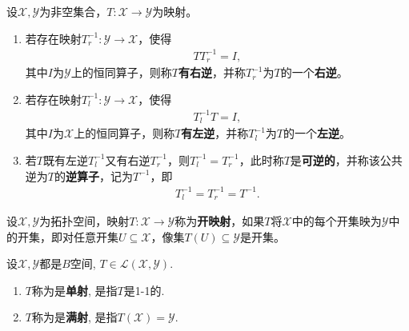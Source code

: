 \documentclass[../../main.tex]{subfiles}%
\begin{document}
\begin{definition}
设$\mathscr{X},\mathscr{Y}$为非空集合，$T:\mathscr{X}\to\mathscr{Y}$为映射。
\begin{enumerate}[(1)]
\item 若存在映射$T_r^{-1}:\mathscr{Y}\to\mathscr{X}$，使得
\begin{align*}
TT_r^{-1} = I,
\end{align*}
其中$I$为$\mathscr{Y}$上的恒同算子，则称$T$\textbf{有右逆}，并称$T_r^{-1}$为$T$的一个\textbf{右逆}。
\item 若存在映射$T_l^{-1}:\mathscr{Y}\to\mathscr{X}$，使得
\begin{align*}
T_l^{-1}T = I,
\end{align*}
其中$I$为$\mathscr{X}$上的恒同算子，则称$T$\textbf{有左逆}，并称$T_l^{-1}$为$T$的一个\textbf{左逆}。
\item 若$T$既有左逆$T_l^{-1}$又有右逆$T_r^{-1}$，则$T_l^{-1}=T_r^{-1}$，此时称$T$是\textbf{可逆的}，并称该公共逆为$T$的\textbf{逆算子}，记为$T^{-1}$，即
\begin{align*}
T_l^{-1} = T_r^{-1} = T^{-1}.
\end{align*}
\end{enumerate}
\end{definition}

\begin{definition}
设$\mathscr{X},\mathscr{Y}$为拓扑空间，映射$T:\mathscr{X}\to\mathscr{Y}$称为\textbf{开映射}，如果$T$将$\mathscr{X}$中的每个开集映为$\mathscr{Y}$中的开集，即对任意开集$U\subseteq\mathscr{X}$，像集$T(U)\subseteq\mathscr{Y}$是开集。
\end{definition}

\begin{definition}
设$\mathscr{X},\mathscr{Y}$都是$B$空间, $T\in\mathscr{L}(\mathscr{X},\mathscr{Y})$.
\begin{enumerate}[(1)]
\item $T$称为是\textbf{单射}, 是指$T$是1-1的.
\item $T$称为是\textbf{满射}, 是指$T(\mathscr{X})=\mathscr{Y}$.
\end{enumerate}
\end{definition}
\end{document}
